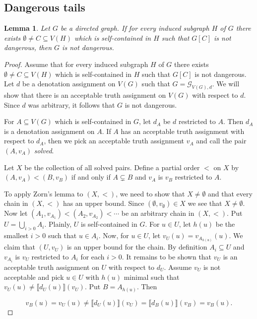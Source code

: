 \documentclass[12pt]{kluwer}
\newtheorem{lem}[thm]{Lemma}
\theoremstyle{remark}
\newcommand{\fancy}[1]{\mathcal{#1}}
\def\G{\fancy{G}}
\begin{document}
\subsection{Dangerous tails}
\begin{lem}\label{GeneralZorn}
Let $G$ be a directed graph. If for every induced subgraph $H$ of $G$ there exists $\emptyset \neq C \subseteq V(H)$ which is self-contained in $H$ such that $G[C]$ is not dangerous, then $G$ is not dangerous.
\end{lem}
\begin{proof}
Assume that for every induced subgraph $H$ of $G$ there exists $\emptyset \neq C \subseteq V(H)$ which is self-contained in $H$ such that $G[C]$ is not dangerous.  Let $d$ be a denotation assignment on $V(G)$ such that $G = \G_{V(G), d}$. We will show that there is an acceptable truth assignment on $V(G)$ with respect to $d$.  Since $d$ was arbitrary, it follows that $G$ is not dangerous.

For $A \subseteq V(G)$ which is self-contained in $G$, let $d_A$ be $d$ restricted to $A$.  Then $d_A$ is a denotation assignment on $A$.  If $A$ has an  acceptable truth assignment with respect to $d_A$, then we pick an acceptable truth assignment $v_A$ and call the pair $(A, v_A)$ \emph{solved}.

Let $X$ be the collection of all solved pairs.  Define a partial order $<$ on $X$ by $(A, v_A) < (B, v_B)$ if and only if $A \subsetneq B$ and $v_A$ is $v_B$ restricted to $A$.

To apply Zorn's lemma to $(X, <)$, we need to show that $X \neq \emptyset$ and that every chain in  $(X, <)$ has an upper bound. Since $(\emptyset, v_\emptyset) \in X$ we see that $X \neq \emptyset$.  Now let $(A_1, v_{A_1}) < (A_2, v_{A_2}) < \cdots$ be an arbitrary chain in $(X, <)$.  Put $U = \bigcup_{i > 0} A_i$. Plainly, $U$ is self-contained in $G$. For $u \in U$, let $h(u)$ be the smallest $i > 0$ such that $u \in A_i$.  Now, for $u \in U$, let $v_U(u) = v_{A_{h(u)}}(u)$.  We claim that $(U, v_U)$ is an upper bound for the chain.  By definition $A_i \subseteq U$ and $v_{A_i}$ is $v_U$ restricted to $A_i$ for each $i > 0$.  It remains to be shown that $v_U$ is an acceptable truth assignment on $U$ with respect to $d_U$.  Assume $v_U$ is not acceptable and pick $u \in U$ with $h(u)$ minimal such that $v_U(u) \neq \llbracket d_U(u)\rrbracket(v_U)$.  Put $B = A_{h(u)}$. Then

\[v_B(u) = v_U(u) \neq \llbracket d_U(u)\rrbracket(v_U) = \llbracket d_B(u)\rrbracket(v_B) = v_B(u).\]


\end{proof}
\end{document}
